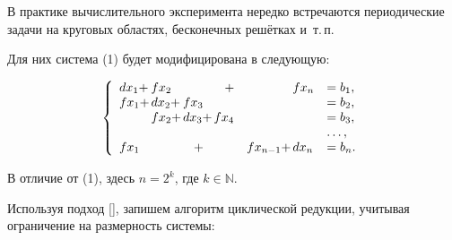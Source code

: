 В практике вычислительного эксперимента нередко встречаются периодические задачи на круговых областях, бесконечных решётках и~т.\,п. 

Для них система (1) будет модифицирована в следующую:  

\begin{equation*}

  \left\{

  \begin{array}{llllllllllllll}

  dx_1 +  & \hspace{-3mm} fx_2   &        &   +   &    & \hspace{-3mm} fx_n  &=b_1,\\

  fx_1 +  & \hspace{-3mm} dx_2 + & \hspace{-3mm} fx_3   &      &    &  &=b_2,\\

          & \hspace{-3mm} fx_2 + & \hspace{-3mm} dx_3 + & \hspace{-3mm} fx_4 &    &  &=b_3, \\

          &        &        &      &    &  & \dots,\\

  fx_1   &        &  +      &      &  fx_{n-1}+  & \hspace{-3mm} dx_n &=b_n.

  \end{array} \right.

  \end{equation*}

В отличие от (1),  здесь $n=2^k$, где $k\in \mathbb N$.

Используя подход [], запишем алгоритм циклической редукции, учитывая ограничение на размерность системы:



\vspace{3mm}



